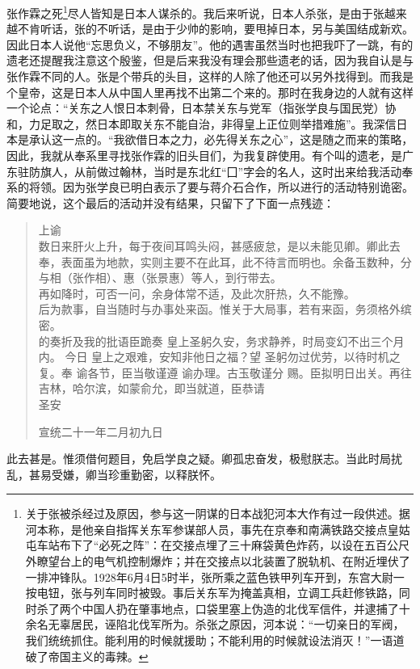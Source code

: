 张作霖之死\footnote{关于张被杀经过及原因，参与这一阴谋的日本战犯河本大作有过一段供述。据河本称，是他亲自指挥关东军参谋部人员，事先在京奉和南满铁路交接点皇姑屯车站布下了“必死之阵”：在交接点埋了三十麻袋黄色炸药，以设在五百公尺外瞭望台上的电气机控制爆炸；并在交接点以北装置了脱轨机、在附近埋伏了一排冲锋队。1928年6月4日5时半，张所乘之蓝色铁甲列车开到，东宫大尉一按电钮，张与列车同时被毁。事后关东军为掩盖真相，立调工兵赶修铁路，同时杀了两个中国人扔在肇事地点，口袋里塞上伪造的北伐军信件，并逮捕了十余名无辜居民，诬陷北伐军所为。杀张之原因，河本说：“一切亲日的军阀，我们统统抓住。能利用的时候就援助；不能利用的时候就设法消灭！”一语道破了帝国主义的毒辣。}尽人皆知是日本人谋杀的。我后来听说，日本人杀张，是由于张越来越不肯听话，张的不听话，是由于少帅的影响，要甩掉日本，另与美国结成新欢。因此日本人说他“忘思负义，不够朋友”。他的遇害虽然当时也把我吓了一跳，有的遗老还提醒我注意这个殷鉴，但是后来我没有理会那些遗老的话，因为我自认是与张作霖不同的人。张是个带兵的头目，这样的人除了他还可以另外找得到。而我是个皇帝，这是日本人从中国人里再找不出第二个来的。那时在我身边的人就有这样一个论点：“关东之人恨日本刺骨，日本禁关东与党军（指张学良与国民党）协和，力足取之，然日本即取关东不能自治，非得皇上正位则举措难施”。我深信日本是承认这一点的。“我欲借日本之力，必先得关东之心”，这是随之而来的策略，因此，我就从奉系里寻找张作霖的旧头目们，为我复辟使用。有个叫的遗老，是广东驻防旗人，从前做过翰林，当时是东北红“囗”字会的名人，这时出来给我活动奉系的将领。因为张学良已明白表示了要与蒋介石合作，所以进行的活动特别诡密。简要地说，这个最后的活动并没有结果，只留下了下面一点残迹：\\

\begin{quote}
	上谕\\

数日来肝火上升，每于夜间耳鸣头闷，甚感疲怠，是以未能见卿。卿此去奉，表面虽为地款，实则主要不在此耳，此不待言而明也。余备玉数种，分与相（张作相）、惠（张景惠）等人，到行带去。\\

再如降时，可否一问，余身体常不适，及此次肝热，久不能豫。\\

后为款事，自当随时与办事处来函。惟关于大局事，若有来函，务须格外缤密。\\

的奏折及我的批语臣跪奏  皇上圣躬久安，务求静养，时局变幻不出三个月内。  今日  皇上之艰难，安知非他日之福？望  圣躬勿过优劳，以待时机之复。奉  谕各节，臣当敬谨遵  谕办理。古玉敬谨分  赐。臣拟明日出关。再往吉林，哈尔滨，如蒙俞允，即当就道，臣恭请\\

圣安\\

\begin{flushright}
	宣统二十一年二月初九日\\
\end{flushright}
\end{quote}

此去甚是。惟须借何题目，免启学良之疑。卿孤忠奋发，极慰朕志。当此时局扰乱，甚易受嫌，卿当珍重勤密，以释朕怀。
